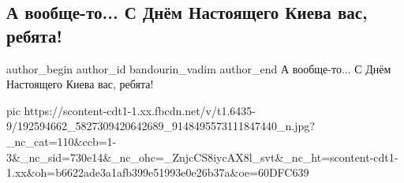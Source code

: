  
 
 
 
 
 
\subsection{А вообще-то... С Днём Настоящего Киева вас, ребята!}
\label{sec:30_05_2021.fb.bandourin_vadim.1.den_kieva}
\ifcmt
 author_begin
   author_id bandourin_vadim
 author_end
\fi
А вообще-то... С Днём Настоящего Киева вас, ребята!

\ifcmt
  pic https://scontent-cdt1-1.xx.fbcdn.net/v/t1.6435-9/192594662_5827309420642689_9148495573111847440_n.jpg?_nc_cat=110&ccb=1-3&_nc_sid=730e14&_nc_ohc=_ZnjcCS8iycAX8l_svt&_nc_ht=scontent-cdt1-1.xx&oh=b6622ade3a1afb399e51993e0e26b37a&oe=60DFC639
\fi
